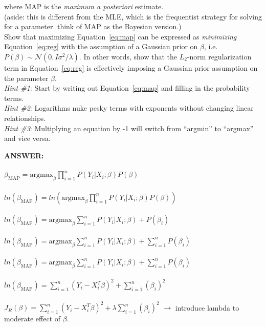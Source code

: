 \documentclass[paper=a4, fontsize=11pt]{scrartcl} %
\numberwithin{figure}{section} %
\numberwithin{table}{section} %
\begin{document}
where MAP is the \emph{maximum a posteriori} estimate. \\

(aside: this is different from the MLE, which is the frequentist strategy for solving for a parameter. think of MAP as the Bayesian version.) \\

Show that maximizing Equation~\ref{eq:map} can be expressed as \emph{minimizing} Equation~\ref{eq:reg} with the assumption of a Gaussian prior on $\beta$, i.e. $P(\beta) \sim \mathcal{N}(0, I\sigma^2 / \lambda)$. In other words, show that the $L_2$-norm regularization term in Equation~\ref{eq:reg} is effectively imposing a Gaussian prior assumption on the parameter $\beta$. \\

\emph{Hint \#1}: Start by writing out Equation~\ref{eq:map} and filling in the probability terms. \\

\emph{Hint \#2}: Logarithms nuke pesky terms with exponents without changing linear relationships. \\

\emph{Hint \#3}: Multiplying an equation by -1 will switch from ``argmin'' to ``argmax'' and vice versa. \\

\begin{addmargin}[2em]{2em}
  \textbf{ANSWER:}\\\\
  $\beta_{\textrm{MAP}} = \textrm{argmax}_{\beta} \prod_{i = 1}^n P(Y_i | X_i; \beta) P(\beta)$
  \\\\
  $ln(\beta_{\textrm{MAP}}) = ln(\textrm{argmax}_{\beta} \prod_{i = 1}^n P(Y_i | X_i; \beta) P(\beta))$
  \\\\
  $ln(\beta_{\textrm{MAP}}) = \textrm{argmax}_{\beta} \sum_{i = 1}^n P(Y_i | X_i; \beta) + P(\beta_i)$
  \\\\
  $ln(\beta_{\textrm{MAP}}) = \textrm{argmax}_{\beta} \sum_{i = 1}^n P(Y_i | X_i; \beta) + \sum_{i=1}^nP(\beta_i)$
  \\\\
  $ln(\beta_{\textrm{MAP}}) = \textrm{argmax}_{\beta} \sum_{i = 1}^n P(Y_i | X_i; \beta) + \sum_{i=1}^nP(\beta_i)$
  \\\\
  $ln(\beta_{\textrm{MAP}}) = \sum_{i = 1}^n (Y_i - X_i^T \beta)^2  + \sum_{i=1}^n(\beta_i)^2$
  \\\\
  $J_R(\beta) = \sum_{i = 1}^n (Y_i - X_i^T \beta)^2  + \lambda\sum_{i=1}^n(\beta_i)^2$ $\rightarrow$ introduce lambda to moderate effect of $\beta$.
  \\
\end{addmargin}
\end{document}

